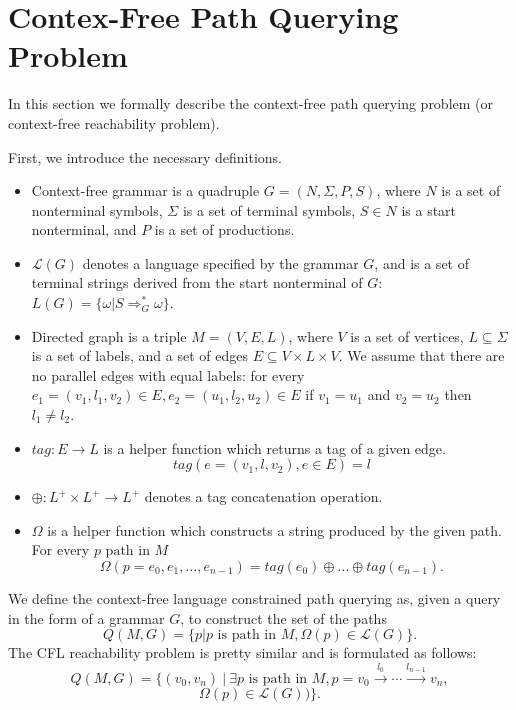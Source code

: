 \section{Contex-Free Path Querying Problem}
\label{sec:CFPQ}

In this section we formally describe the context-free path querying problem (or context-free reachability problem).


First, we introduce the necessary definitions.
\begin{itemize}
  \item Context-free grammar is a quadruple $G=(N, \Sigma, P, S)$, where $N$ is a set of nonterminal symbols, $\Sigma$ is a set of terminal symbols, $S \in N$ is a start nonterminal, and $P$ is a set of productions. 
  \item $\mathcal{L}(G)$ denotes a language specified by the grammar $G$, and is a set of terminal strings derived from the start nonterminal of $G$: $L(G) = \{\omega | S \Rightarrow_{G}^{*} \omega\}$.
  \item Directed graph is a triple $M = (V,E,L)$, where $V$ is a set of vertices, $L \subseteq \Sigma$ is a set of labels, and a set of edges $E\subseteq V\times L\times V$. 
  We assume that there are no parallel edges with equal labels: for every $e_1=(v_1,l_1,v_2) \in E, e_2=(u_1,l_2,u_2) \in E$ if $v_1 = u_1$ and $v_2 = u_2$ then $l_1 \neq l_2$.
  \item $tag: E \rightarrow L$ is a helper function which returns a tag of a given edge. $$tag(e = (v_1,l,v_2), e \in E) = l$$
  \item $\oplus: L^+ \times L^+ \rightarrow L^+$ denotes a tag concatenation operation.
  \item $\Omega$ is a helper function which constructs a string produced by the given path. For every $p \text{ path in } M$
  $$ \Omega(p = e_{0},e_{1},\dots,e_{n-1}) = tag (e_{0}) \oplus \dots \oplus tag (e_{n-1}).$$
\end{itemize}

We define the context-free language constrained path querying as, given a query in the form of a grammar $G$, to construct the set of the paths $$Q(M,G)=\{p|p \text{ is path in } M, \Omega(p) \in \mathcal{L}(G)\}.$$
The CFL reachability problem is pretty similar and is formulated as follows: $$Q(M,G) =\{ (v_0,v_n) \ | \ \exists p \text{ is path in } M, p = v_0 \xrightarrow{l_0} \cdots \xrightarrow{l_{n-1}}v_n,$$
$$ \Omega(p) \in \mathcal{L}(G))\}.$$

